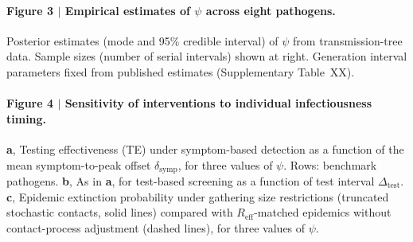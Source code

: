 \documentclass[10pt]{article}
\begin{document}
\paragraph{Figure 3 $|$ Empirical estimates of $\psi$ across eight pathogens.}
Posterior estimates (mode and 95\% credible interval) of $\psi$ from transmission-tree data. Sample sizes (number of serial intervals) shown at right. Generation interval parameters fixed from published estimates (Supplementary Table~XX).

\paragraph{Figure 4 $|$ Sensitivity of interventions to individual infectiousness timing.}
\textbf{a}, Testing effectiveness (TE) under symptom-based detection as a function of the mean symptom-to-peak offset $\delta_\text{symp}$, for three values of $\psi$. Rows: benchmark pathogens.
\textbf{b}, As in \textbf{a}, for test-based screening as a function of test interval $\Delta_\text{test}$.
\textbf{c}, Epidemic extinction probability under gathering size restrictions (truncated stochastic contacts, solid lines) compared with $R_\text{eff}$-matched epidemics without contact-process adjustment (dashed lines), for three values of $\psi$.
\end{document}
